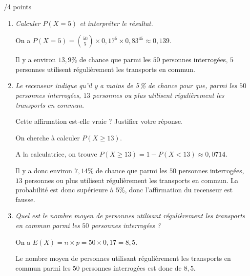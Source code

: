 \documentclass[a4paper]{article}
\begin{document}
\begin{exerciceinterro}{\hspace{2cm}/4 points}{}
\begin{enumerate}
\item \textit{Calculer $P(X = 5)$ et interpréter le résultat.}

On a $P(X = 5)=\binom{50}{5} \times 0,17^5 \times 0,83^{45}\approx 0,139$.

Il y a environ $13,9\%$ de chance que parmi les $50$ personnes interrogées, $5$ personnes utilisent régulièrement les transports en commun.
\item \textit{Le recenseur indique qu'il y a moins de 5\,\% de chance pour que, parmi les $50$ personnes interrogées, $13$ personnes ou plus utilisent régulièrement les transports en commun.}

Cette affirmation est-elle vraie ? Justifier votre réponse.

On cherche à calculer $P(X \geqslant 13)$.

A la calculatrice, on trouve $P(X \geqslant 13)= 1- P(X < 13) \approx 0,0714$.

Il y a donc environ $7,14\%$ de chance que parmi les $50$ personnes interrogées, $13$ personnes ou plus utilisent régulièrement les transports en commun. La probabilité est donc supérieure à $5\%$, donc l'affirmation du recenseur est fausse.

\item \textit{Quel est le nombre moyen de personnes utilisant régulièrement les transports en commun parmi les $50$ personnes interrogées ?}

On a $E(X)=n\times p=50\times 0,17=8,5$.

Le nombre moyen de personnes utilisant régulièrement les transports en commun parmi les $50$ personnes interrogées est donc de $8,5$.
\end{enumerate}


\end{exerciceinterro}
\end{document}
